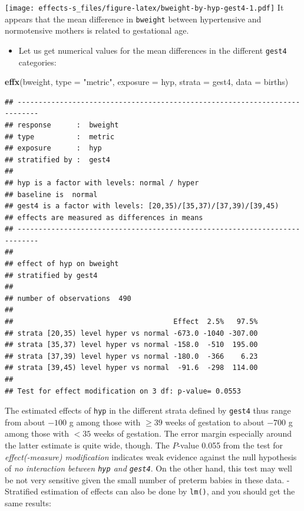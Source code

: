 \documentclass[
]{book}
\newenvironment{Shaded}{\begin{snugshade}}{\end{snugshade}}
\newcommand{\AttributeTok}[1]{\textcolor[rgb]{0.13,0.29,0.53}{#1}}
\newcommand{\FunctionTok}[1]{\textcolor[rgb]{0.13,0.29,0.53}{\textbf{#1}}}
\newcommand{\NormalTok}[1]{#1}
\newcommand{\StringTok}[1]{\textcolor[rgb]{0.31,0.60,0.02}{#1}}
\providecommand{\tightlist}{%
  \setlength{\itemsep}{0pt}\setlength{\parskip}{0pt}}
\begin{document}
\texttt{[image: effects-s\_files/figure-latex/bweight-by-hyp-gest4-1.pdf]}
It appears that the mean difference in \texttt{bweight} between
hypertensive and normotensive
mothers is related to gestational age.

\begin{itemize}
\tightlist
\item
  Let us get numerical values for the mean differences
  in the different \texttt{gest4} categories:
\end{itemize}

\begin{Shaded}
\begin{Highlighting}[]
\FunctionTok{effx}\NormalTok{(bweight, }\AttributeTok{type =} \StringTok{"metric"}\NormalTok{, }\AttributeTok{exposure =}\NormalTok{ hyp, }\AttributeTok{strata =}\NormalTok{ gest4, }\AttributeTok{data =}\NormalTok{ births)}
\end{Highlighting}
\end{Shaded}

\begin{verbatim}
## --------------------------------------------------------------------------- 
## response      :  bweight 
## type          :  metric 
## exposure      :  hyp 
## stratified by :  gest4 
## 
## hyp is a factor with levels: normal / hyper 
## baseline is  normal 
## gest4 is a factor with levels: [20,35)/[35,37)/[37,39)/[39,45) 
## effects are measured as differences in means 
## --------------------------------------------------------------------------- 
## 
## effect of hyp on bweight 
## stratified by gest4 
## 
## number of observations  490 
## 
##                                      Effect  2.5%   97.5%
## strata [20,35) level hyper vs normal -673.0 -1040 -307.00
## strata [35,37) level hyper vs normal -158.0  -510  195.00
## strata [37,39) level hyper vs normal -180.0  -366    6.23
## strata [39,45) level hyper vs normal  -91.6  -298  114.00
## 
## Test for effect modification on 3 df: p-value= 0.0553
\end{verbatim}

The estimated effects of \texttt{hyp} in the different strata defined by \texttt{gest4} thus
range from about \(-100\) g among those with \(\geq 39\) weeks of gestation to about \(-700\) g among those
with \(< 35\) weeks of gestation. The error margin especially
around the latter estimate is quite wide, though.
The \(P\)-value 0.055 from the test for
\emph{effect(-measure) modification} indicates weak evidence
against the null hypothesis of \emph{no interaction between \texttt{hyp} and \texttt{gest4}}.
On the other hand, this test may well be not very sensitive given
the small number of preterm babies in these data.
- Stratified estimation of effects can also be done by \texttt{lm()},
and you should get the same results:
\end{document}

